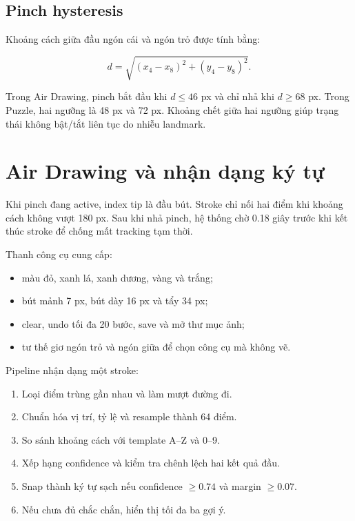 \documentclass[12pt,a4paper]{article}
\begin{document}
\subsection{Pinch hysteresis}

Khoảng cách giữa đầu ngón cái và ngón trỏ được tính bằng:

\begin{equation}
d=\sqrt{(x_4-x_8)^2+(y_4-y_8)^2}.
\end{equation}

Trong Air Drawing, pinch bắt đầu khi $d\le46$ px và chỉ nhả khi $d\ge68$ px.
Trong Puzzle, hai ngưỡng là 48 px và 72 px. Khoảng chết giữa hai ngưỡng giúp
trạng thái không bật/tắt liên tục do nhiễu landmark.

\section{Air Drawing và nhận dạng ký tự}

Khi pinch đang active, index tip là đầu bút. Stroke chỉ nối hai điểm khi khoảng
cách không vượt 180 px. Sau khi nhả pinch, hệ thống chờ 0.18 giây trước khi kết
thúc stroke để chống mất tracking tạm thời.

Thanh công cụ cung cấp:

\begin{itemize}
  \item màu đỏ, xanh lá, xanh dương, vàng và trắng;
  \item bút mảnh 7 px, bút dày 16 px và tẩy 34 px;
  \item clear, undo tối đa 20 bước, save và mở thư mục ảnh;
  \item tư thế giơ ngón trỏ và ngón giữa để chọn công cụ mà không vẽ.
\end{itemize}

Pipeline nhận dạng một stroke:

\begin{enumerate}
  \item Loại điểm trùng gần nhau và làm mượt đường đi.
  \item Chuẩn hóa vị trí, tỷ lệ và resample thành 64 điểm.
  \item So sánh khoảng cách với template A--Z và 0--9.
  \item Xếp hạng confidence và kiểm tra chênh lệch hai kết quả đầu.
  \item Snap thành ký tự sạch nếu confidence $\ge0.74$ và margin $\ge0.07$.
  \item Nếu chưa đủ chắc chắn, hiển thị tối đa ba gợi ý.
\end{enumerate}
\end{document}
